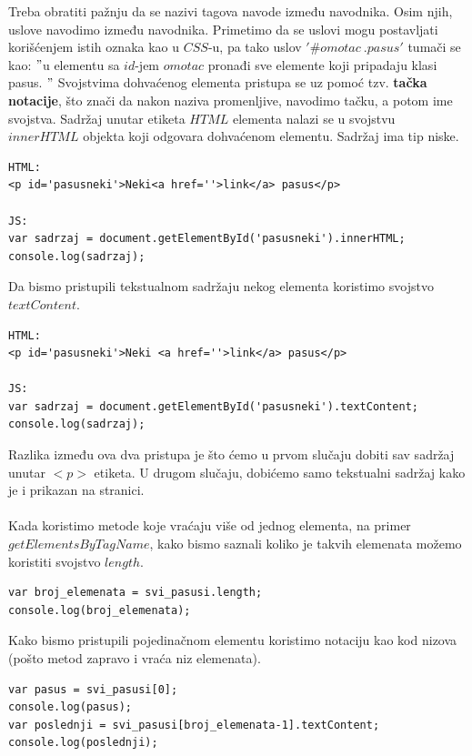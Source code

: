 \documentclass[a4paper]{article}
\begin{document}
Treba obratiti pažnju da se nazivi tagova navode između navodnika. Osim njih, uslove navodimo između navodnika. Primetimo da se uslovi mogu postavljati korišćenjem istih oznaka kao u $CSS$-u, pa tako uslov $'\#omotac\ .pasus'$ tumači se kao: $"$u elementu sa $id$-jem $omotac$ pronađi sve elemente koji pripadaju klasi pasus. $"$
Svojstvima dohvaćenog elementa pristupa se uz pomoć tzv. \textbf{tačka notacije}, što znači da nakon naziva promenljive, navodimo tačku, a potom ime svojstva. Sadržaj unutar etiketa $HTML$ elementa nalazi se u svojstvu $innerHTML$ objekta koji odgovara dohvaćenom elementu. Sadržaj ima tip niske.
\begin{lstlisting}[backgroundcolor = \color{lightgray}]
HTML:
<p id='pasusneki'>Neki<a href=''>link</a> pasus</p>

JS:
var sadrzaj = document.getElementById('pasusneki').innerHTML;
console.log(sadrzaj);
\end{lstlisting} 	 
Da bismo pristupili tekstualnom sadržaju nekog elementa koristimo svojstvo $textContent$.
\begin{lstlisting}[backgroundcolor = \color{lightgray}]
HTML:
<p id='pasusneki'>Neki <a href=''>link</a> pasus</p>

JS:
var sadrzaj = document.getElementById('pasusneki').textContent;
console.log(sadrzaj);
\end{lstlisting}

Razlika između ova dva pristupa je što ćemo u prvom slučaju dobiti sav sadržaj unutar $<p>$ etiketa. U drugom slučaju, dobićemo samo tekstualni sadržaj kako je i prikazan na stranici. \\\\
Kada koristimo metode koje vraćaju više od jednog elementa, na primer $getElementsByTagName$, kako bismo saznali koliko je takvih elemenata možemo koristiti svojstvo $length$.
\begin{lstlisting}[backgroundcolor = \color{lightgray}]
var broj_elemenata = svi_pasusi.length;
console.log(broj_elemenata);
\end{lstlisting}
Kako bismo pristupili pojedinačnom elementu koristimo notaciju kao kod nizova (pošto metod zapravo i vraća niz elemenata).
\begin{lstlisting}[backgroundcolor = \color{lightgray}]
var pasus = svi_pasusi[0];
console.log(pasus);
var poslednji = svi_pasusi[broj_elemenata-1].textContent;
console.log(poslednji);
\end{lstlisting}

\end{document}
